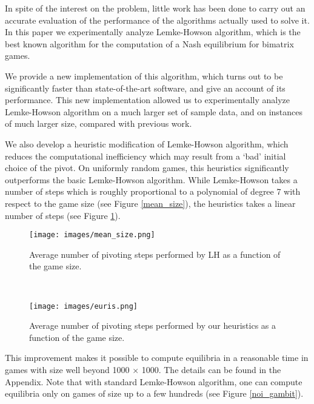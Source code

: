 \documentclass[11pt]{article}
\begin{document}
In spite of the interest on the problem, little work has been done
to carry out an accurate evaluation of the performance of the
algorithms actually used to solve it. In this paper we
experimentally analyze Lemke-Howson algorithm, which is the best
known algorithm for the computation of a Nash equilibrium for
bimatrix games.

We  provide a new implementation of this algorithm, which turns out
to be significantly faster than state-of-the-art software, and give
an account of its performance. This new implementation allowed us to
experimentally analyze Lemke-Howson algorithm on a much larger set
of sample data, and on instances of much larger size, compared with
previous work.

We also develop a heuristic modification of Lemke-Howson
algorithm, which reduces the computational inefficiency which may
result from a `bad' initial choice of the pivot. On uniformly random
games, this heuristics significantly outperforms the basic
Lemke-Howson algorithm. While Lemke-Howson takes a number of steps which is roughly
proportional to a
polynomial of degree 7 with respect to the game size (see Figure
\ref{mean_size}), the heuristics takes a linear number of steps
(see Figure \ref{mean_size_heu}).

\begin{center}
\begin{figure}[h]
\begin{minipage}[t]{6cm}
\centering
\texttt{[image: images/mean\_size.png]}
\caption{Average number of pivoting steps performed by LH as a
function of the game size.}
\label{mean_size}
\end{minipage}
\ \hspace{2mm} \hspace{3mm} \
\begin{minipage}[t]{6cm}
\centering
\texttt{[image: images/euris.png]}
\caption{Average number of pivoting steps performed by our heuristics
as a function of the game size.}
\label{mean_size_heu}
\end{minipage}
\end{figure}
\end{center}

This improvement makes it possible to compute equilibria in a reasonable time 
in games with size well beyond 1000 $\times$ 1000. The details can be found in the Appendix.
Note that with standard Lemke-Howson algorithm, one can compute equilibria only on games
of size up to a few hundreds (see Figure \ref{noi_gambit}).
\end{document}

